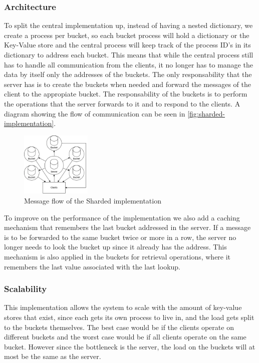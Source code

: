 \documentclass{article}
\begin{document}
\subsubsection{Architecture}
To split the central implementation up, instead of having a nested dictionary,
we create a process per bucket, so each bucket process will hold a
dictionary or the Key-Value store and the central process will keep track of the process ID's in its
dictionary to address each bucket. This means that while the central process still has to handle all
communication from the clients, it no longer has to manage the data by itself
only the addresses of the buckets.
The only responsability that the server has is to create the buckets when needed
and forward the messages of the client to the appropiate bucket. The
responsability of the buckets is to perform the operations that the server
forwards to it and to respond to the clients. A diagram showing the flow of
communication can be seen in \autoref{fig:sharded-implementation}.\\
\begin{figure}[h]
	\centering
	\includegraphics[width=0.3\textwidth]{sharded-implementation.png}
	\caption{Message flow of the Sharded implementation}
	\label{fig:sharded-implementation}
\end{figure}
To improve on the performance of the implementation we also add a caching
mechanism that remembers the last bucket addressed in the server. If a message
is to be forwarded to the same bucket twice or more in a row, the server no
longer needs to look the bucket up since it already has the address.
This mechanism is also applied in the buckets for retrieval operations, where it
remembers the last value associated with the last lookup.
\subsubsection{Scalability}
This implementation allows the system to scale with the amount of key-value
stores that exist, since each gets its own process to live in, and the load gets
split to the buckets themselves. The best case would be if the clients operate
on different buckets and the worst case would be if all clients operate on the
same bucket. However since the bottleneck is the server, the load on the buckets
will at most be the same as the server.
\end{document}
